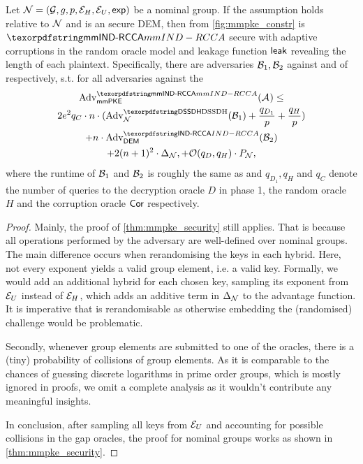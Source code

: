 \begin{theorem}
  Let $\ngroup = (\nG, g, p, \nGE, \nGU, \nGexp)$ be a nominal group.
  If the \sdh assumption holds relative to  $\ngroup$ and \dem is an \indrcca secure DEM, then \mmPKE from
  \cref{fig:mmpke_constr} is $\mmindrcca$ secure with adaptive corruptions in the random oracle model and leakage
  function $\leak$ revealing the length of each plaintext. Specifically, there are adversaries $\Bdv[1],\Bdv[2]$ against
  \sdh and \indrcca of \dem respectively, s.t. for all adversaries \Adv against the \mmindrcca
  \begin{multline*}
    \adv{\mmindrcca}{\mmPKE}({\Adv}) \leq \\2e^2q_C\cdot n\cdot(\adv{\sdh}{\ngroup}({\Bdv[1]}) +
                                       \frac{q_{D_1}}{p} + \frac{q_{H}}{p}) \\ + n \cdot \adv{\indrcca}{\dem}({\Bdv[2]}) 
    \\+ 2(n+1)^2\cdot\Delta_{\ngroup}, + \mathcal{O}(q_D, q_H)\cdot P_{\ngroup},
  \end{multline*}
  where the runtime of $\Bdv[1]$ and $\Bdv[2]$ is roughly the same as \Adv and $q_{D_1},q_H$ and $q_C$ denote the number of queries to the decryption oracle $D$ in phase 1, the random oracle
  $H$ and the corruption oracle $\term{Cor}$ respectively.
\end{theorem}

\begin{proof}
  Mainly, the proof of \cref{thm:mmpke_security} still applies. That is because all operations performed by the
  adversary are well-defined over nominal groups. The main difference occurs when rerandomising the keys in each 
  hybrid. Here, not every exponent yields a valid group element, i.e. a valid key. Formally, we would add an additional
  hybrid for each chosen key, sampling its exponent from $\nGU$ instead of $\nGE$, which adds an additive term in $\Delta_{\ngroup}$ to
  the advantage function. It is imperative that \ngroup is rerandomisable as otherwise embedding the (randomised)
  challenge would be problematic.
  
  Secondly, whenever group elements are submitted to one of the oracles, there is a (tiny) probability of collisions of
  group elements. As it is comparable to the chances of guessing discrete logarithms in prime order groups, which is
  mostly ignored in proofs, we omit a complete analysis as it wouldn't contribute any meaningful insights.

  In conclusion, after sampling all keys from $\nGU$ and accounting for possible collisions in the gap oracles, the
  proof for nominal groups works as shown in \cref{thm:mmpke_security}.
\end{proof}

